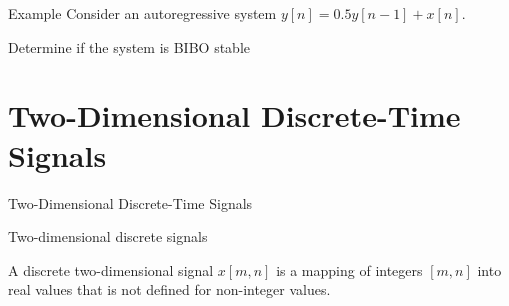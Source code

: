 \documentclass[aspectratio=169,xcolor=dvipsnames,svgnames,x11names,fleqn]{beamer}
\begin{document}
\begin{frame}{Example}
    Consider an autoregressive system
    $y[n] = 0.5y[n - 1] + x[n]$.

    Determine if the system is BIBO stable
    
\end{frame}

\begin{frame}{}
\vspace*{-9\baselineskip}
    \color{LightGray}{Blank space for calculation}
\end{frame}
\begin{frame}{}
\vspace*{-9\baselineskip}
    \color{LightGray}{Blank space for calculation}
\end{frame}
\begin{frame}{}
\vspace*{-9\baselineskip}
    \color{LightGray}{Blank space for calculation}
\end{frame}

\begin{frame}{}
\vspace*{-9\baselineskip}
    \color{LightGray}{Blank space for calculation}
\end{frame}

\section{Two-Dimensional Discrete-Time Signals}


\begin{frame}{}
    \begin{center}
    \Huge \bf \color{DarkBlue}
    \faFileImageO
    
   Two-Dimensional Discrete-Time Signals

\end{center}
\end{frame}

\begin{frame}{Two-dimensional discrete signals}

    \Large

    A discrete two-dimensional signal $x[m, n]$ is a mapping of integers $[m, n]$ into real values that is not defined for non-integer values.
\end{frame}
\end{document}
